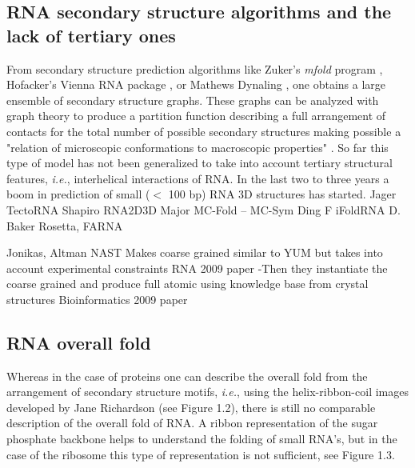 \subsection{RNA secondary structure algorithms and the lack of tertiary ones}
From   secondary   structure   prediction  algorithms   like   Zuker's
\textit{mfold} program \cite{zuker2003}, Hofacker's Vienna RNA package
\cite{hofacker1994},  or   Mathews  Dynaling  \cite{mathews2002},  one
obtains a large ensemble  of secondary structure graphs.  These graphs
can  be analyzed  with graph  theory to  produce a  partition function
describing  a full  arrangement of  contacts for  the total  number of
possible secondary structures making possible a "relation of
microscopic      conformations     to      macroscopic     properties"
\cite{chen2000}. So far this type of model has not been generalized to
take into account tertiary structural features, \textit{i.e.}, interhelical
interactions of RNA.
In the last two to three years  a boom in prediction of small ($<$ 100
bp) RNA 3D structures has started.
Jager TectoRNA
Shapiro RNA2D3D
Major MC-Fold -- MC-Sym
Ding F iFoldRNA
D. Baker Rosetta, FARNA 

Jonikas, Altman  NAST  Makes coarse grained similar to YUM but takes into account 
experimental constraints  RNA 2009 paper
 -Then they instantiate the coarse grained and produce full atomic using knowledge 
base from crystal structures Bioinformatics 2009 paper



\subsection{RNA overall fold}
Whereas in the case of proteins one can describe the overall fold
from the arrangement of secondary structure motifs, \textit{i.e.}, using the
helix-ribbon-coil images developed by Jane Richardson
\cite{richardson2000} (see Figure 1.2), there is still no comparable
description of the overall fold of RNA. A ribbon
representation of the sugar phosphate backbone helps to understand the
folding of small RNA's, but in the case of the ribosome this type of 
representation is not sufficient, see Figure 1.3.

